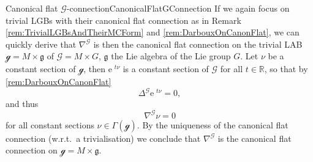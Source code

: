 \documentclass[reqno,a4paper,oneside]{amsart}
\newcommand{\e}{\ensuremath{\mathrm{e\;\!}}}
\theoremstyle{plain}
\theoremstyle{remark}
\theoremstyle{definition}
\begin{document}
\begin{examples}{Canonical flat $\mathcal{G}$-connection}{CanonicalFlatGConnection}
If we again focus on trivial LGBs with their canonical flat connection as in Remark \ref{rem:TrivialLGBsAndTheirMCForm} and \ref{rem:DarbouxOnCanonFlat}, we can quickly derive that $\nabla^{\mathcal{G}}$ is then the canonical flat connection on the trivial LAB $\mathcal{g} = M \times \mathfrak{g}$ of $\mathcal{G} = M \times G$, $\mathfrak{g}$ the Lie algebra of the Lie group $G$. Let $\nu$ be a constant section of $\mathcal{g}$, then $\e^{t\nu}$ is a constant section of $\mathcal{G}$ for all $t \in \mathbb{R}$, so that by \ref{rem:DarbouxOnCanonFlat}
\begin{equation*}
\Delta^{\mathcal{G}} \e^{t\nu}
=
0,
\end{equation*}
and thus
\begin{equation*}
\nabla^{\mathcal{G}} \nu
=
0
\end{equation*}
for all constant sections $\nu \in \Gamma(\mathcal{g})$. By the uniqueness of the canonical flat connection (w.r.t.\ a trivialisation) we conclude that $\nabla^{\mathcal{G}}$ is the canonical flat connection on $\mathcal{g} = M \times \mathfrak{g}$.
\end{examples}
\end{document}
